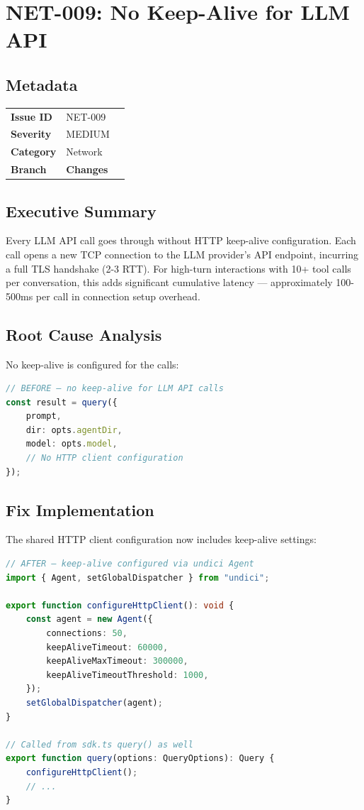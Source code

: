 \section{NET-009: No Keep-Alive for LLM API}
\label{sec:net-009}
\subsection*{Metadata}
\begin{tabular}{ll}
\textbf{Issue ID} & NET-009 \\
\textbf{Severity} & MEDIUM \\
\textbf{Category} & Network \\
\textbf{Branch} & 
\textbf{Changes} &  \\
\end{tabular}

\subsection*{Executive Summary}
Every LLM API call goes through  without HTTP keep-alive configuration. Each call opens a new TCP connection to the LLM provider's API endpoint, incurring a full TLS handshake (2-3 RTT). For high-turn interactions with 10+ tool calls per conversation, this adds significant cumulative latency — approximately 100-500ms per call in connection setup overhead.

\subsection*{Root Cause Analysis}
No keep-alive is configured for the  calls:

\begin{lstlisting}[language=TypeScript]
// BEFORE — no keep-alive for LLM API calls
const result = query({
    prompt,
    dir: opts.agentDir,
    model: opts.model,
    // No HTTP client configuration
});
\end{lstlisting}

\subsection*{Fix Implementation}
The shared HTTP client configuration now includes keep-alive settings:

\begin{lstlisting}[language=TypeScript]
// AFTER — keep-alive configured via undici Agent
import { Agent, setGlobalDispatcher } from "undici";

export function configureHttpClient(): void {
    const agent = new Agent({
        connections: 50,
        keepAliveTimeout: 60000,
        keepAliveMaxTimeout: 300000,
        keepAliveTimeoutThreshold: 1000,
    });
    setGlobalDispatcher(agent);
}

// Called from sdk.ts query() as well
export function query(options: QueryOptions): Query {
    configureHttpClient();
    // ...
}
\end{lstlisting}

